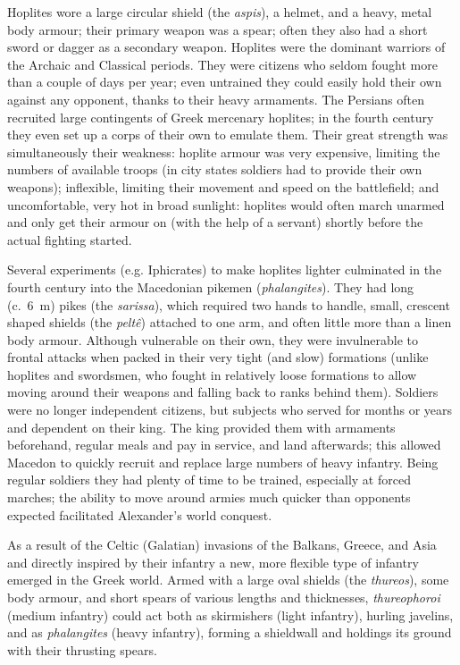 \documentclass{article}
\begin{document}
Hoplites wore a large circular shield (the \textit{aspis}), a helmet, and a heavy, metal body armour; their primary weapon was a spear; often they also had a short sword or dagger as a secondary weapon. Hoplites were the dominant warriors of the Archaic and Classical periods. They were citizens who seldom fought more than a couple of days per year; even untrained they could easily hold their own against any opponent, thanks to their heavy armaments. The Persians often recruited large contingents of Greek mercenary hoplites; in the fourth century they even set up a corps of their own to emulate them. Their great strength was simultaneously their weakness: hoplite armour was very expensive, limiting the numbers of available troops (in city states soldiers had to provide their own weapons); inflexible, limiting their movement and speed on the battlefield; and uncomfortable, very hot in broad sunlight: hoplites would often march unarmed and only get their armour on (with the help of a servant) shortly before the actual fighting started.

Several experiments (e.g. Iphicrates) to make hoplites lighter culminated in the fourth century into the Macedonian pikemen (\textit{phalangites}). They had long (c.~6~m) pikes (the \textit{sarissa}), which required two hands to handle, small, crescent shaped shields (the \textit{pelt\^e}) attached to one arm, and often little more than a linen body armour. Although vulnerable on their own, they were invulnerable to frontal attacks when packed in their very tight (and slow) formations (unlike hoplites and swordsmen, who fought in relatively loose formations to allow moving around their weapons and falling back to ranks behind them). Soldiers were no longer independent citizens, but subjects who served for months or years and dependent on their king. The king provided them with armaments beforehand, regular meals and pay in service, and land afterwards; this allowed Macedon to quickly recruit and replace large numbers of heavy infantry. Being regular soldiers they had plenty of time to be trained, especially at forced marches; the ability to move around armies much quicker than opponents expected facilitated Alexander's world conquest.

As a result of the Celtic (Galatian) invasions of the Balkans, Greece, and Asia and directly inspired by their infantry a new, more flexible type of infantry emerged in the Greek world. Armed with a large oval shields (the \textit{thureos}), some body armour, and short spears of various lengths and thicknesses, \textit{thureophoroi} (medium infantry) could act both as skirmishers (light infantry), hurling javelins, and as \textit{phalangites} (heavy infantry), forming a shieldwall and holdings its ground with their thrusting spears.
\end{document}

